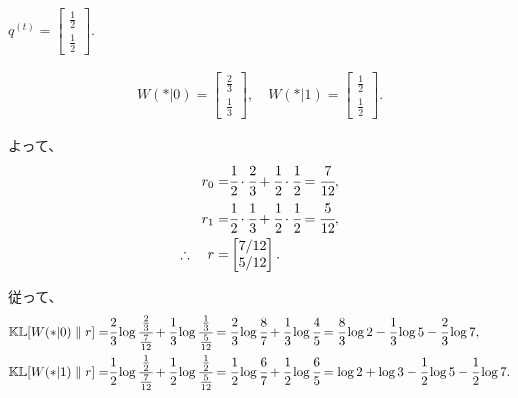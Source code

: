 \begin{example}

$q^{(t)} = \begin{bmatrix} \frac{1}{2} \\ \frac{1}{2} \end{bmatrix}$.

\begin{align*}
	W (\ast | 0)
	= \begin{bmatrix} \frac{2}{3} \\ \frac{1}{3} \end{bmatrix}, \quad
	W (\ast | 1)
	= \begin{bmatrix} \frac{1}{2} \\ \frac{1}{2} \end{bmatrix}.
\end{align*}
\begin{center}
\end{center}

よって、
\begin{align*}
	r_0
		=& \cfrac{1}{2} \cdot \cfrac{2}{3} + \cfrac{1}{2} \cdot \cfrac{1}{2}
		= \cfrac{7}{12}, \\
	r_1
		=& \cfrac{1}{2} \cdot \cfrac{1}{3} + \cfrac{1}{2} \cdot \cfrac{1}{2}
		= \cfrac{5}{12}, \\
	\therefore\quad
	r =& \begin{bmatrix} 7/12 \\ 5/12 \end{bmatrix}.
\end{align*}

従って、
\begin{align*}
	\mathbb{KL}[ W(\ast|0) \parallel r]
		=& \cfrac{2}{3} \log \cfrac{\frac{2}{3}}{\frac{7}{12}} + \cfrac{1}{3} \log \cfrac{\frac{1}{3}}{\frac{5}{12}}
		= \cfrac{2}{3} \log \cfrac{8}{7} + \cfrac{1}{3} \log \cfrac{4}{5}
		= \cfrac{8}{3} \log 2 - \cfrac{1}{3} \log 5 - \cfrac{2}{3} \log 7, \\
	\mathbb{KL}[ W(\ast|1) \parallel r]
		=& \cfrac{1}{2} \log \cfrac{\frac{1}{2}}{\frac{7}{12}} + \cfrac{1}{2} \log \cfrac{\frac{1}{2}}{\frac{5}{12}} 
		= \cfrac{1}{2} \log \cfrac{6}{7} + \cfrac{1}{2} \log \cfrac{6}{5}
		= \log 2 + \log 3 - \cfrac{1}{2} \log 5 - \cfrac{1}{2} \log 7.
\end{align*}


\end{example}
